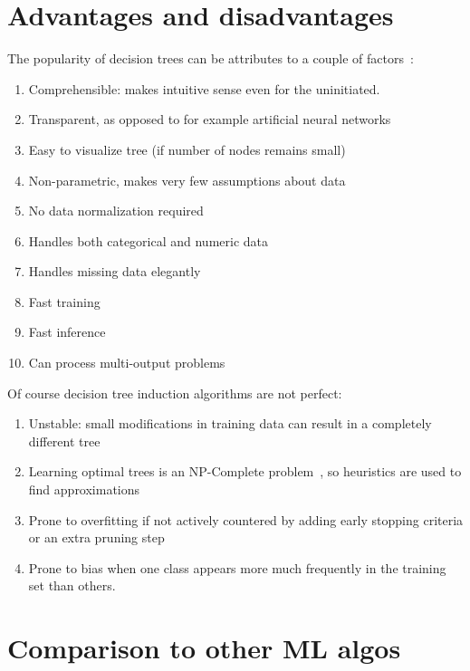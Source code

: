 \section{Advantages and disadvantages} %
The popularity of decision trees can be attributes to a couple of factors~\cite{scikit-learn, murthy1998automatic, kotsiantis2007supervised}:
\begin{enumerate}
    \item Comprehensible: makes intuitive sense even for the uninitiated.
    \item Transparent, as opposed to for example artificial neural networks
    \item Easy to visualize tree (if number of nodes remains small)
    \item Non-parametric, makes very few assumptions about data
    \item No data normalization required
    \item Handles both categorical and numeric data
    \item Handles missing data elegantly %
    \item Fast training
    \item Fast inference
    \item Can process multi-output problems
\end{enumerate}

Of course decision tree induction algorithms are not perfect:
\begin{enumerate}
    \item Unstable: small modifications in training data can result in a completely different tree
    \item Learning optimal trees is an NP-Complete problem~\cite{npcomplete}, so heuristics are used to find approximations
    \item Prone to overfitting if not actively countered by adding early stopping criteria or an extra pruning step
    \item Prone to bias when one class appears more much frequently in the training set than others.
\end{enumerate}

\section{Comparison to other ML algos} %

